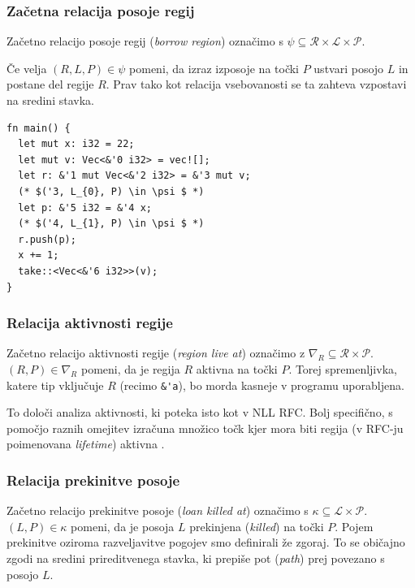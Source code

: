 \documentclass{article}
\begin{document}
\subsubsection{Začetna relacija posoje regij}

Začetno relacijo posoje regij (\textit{borrow region}) označimo s $\psi \subseteq \mathcal{R} \times \mathcal{L} \times \mathcal{P}$.

Če velja $(R,L,P) \in \psi$ pomeni, da izraz izposoje na točki $P$ ustvari posojo $L$ in postane del
regije $R$. Prav tako kot relacija vsebovanosti se ta zahteva vzpostavi na sredini stavka.

\begin{lstlisting}
fn main() {
  let mut x: i32 = 22;
  let mut v: Vec<&'0 i32> = vec![];
  let r: &'1 mut Vec<&'2 i32> = &'3 mut v; 
  (* $('3, L_{0}, P) \in \psi $ *)
  let p: &'5 i32 = &'4 x; 
  (* $('4, L_{1}, P) \in \psi $ *)
  r.push(p);
  x += 1;
  take::<Vec<&'6 i32>>(v);
}
\end{lstlisting}

\subsubsection{Relacija aktivnosti regije}

Začetno relacijo aktivnosti regije (\textit{region live at}) označimo z $\nabla_{R} \subseteq \mathcal{R} \times \mathcal{P}$.
$(R, P) \in \nabla_{R}$ pomeni, da je regija $R$ aktivna na točki $P$. Torej spremenljivka, katere tip vključuje $R$ (recimo \verb|&'a|),
bo morda kasneje v programu uporabljena.

To določi analiza aktivnosti, ki poteka isto kot v NLL RFC. Bolj specifično, s pomočjo raznih omejitev izračuna množico točk
kjer mora biti regija (v RFC-ju poimenovana \textit{lifetime}) aktivna \cite{2094nllRustRFC}.

\subsubsection{Relacija prekinitve posoje}

Začetno relacijo prekinitve posoje (\textit{loan killed at}) označimo s $\kappa \subseteq \mathcal{L} \times \mathcal{P}$.
$(L,P) \in \kappa$ pomeni, da je posoja $L$ prekinjena (\textit{killed}) na točki $P$. Pojem prekinitve oziroma razveljavitve
pogojev smo definirali že zgoraj. To se običajno zgodi na sredini prireditvenega stavka, ki prepiše pot (\textit{path}) prej povezano s posojo $L$.
\end{document}
